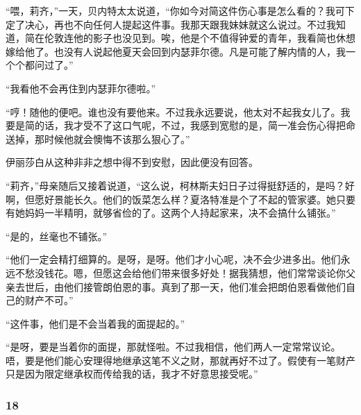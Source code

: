 \par “喂，莉齐，”一天，贝内特太太说道，“你如今对简这件伤心事是怎么看的？我可下定了决心，再也不向任何人提起这件事。我那天跟我妹妹就这么说过。不过我知道，简在伦敦连他的影子也没见到。唉，他是个不值得钟爱的青年，我看简也休想嫁给他了。也没有人说起他夏天会回到内瑟菲尔德。凡是可能了解内情的人，我一个个都问过了。”
\par “我看他不会再住到内瑟菲尔德啦。”
\par “哼！随他的便吧。谁也没有要他来。不过我永远要说，他太对不起我女儿了。我要是简的话，我才受不了这口气呢，不过，我感到宽慰的是，简一准会伤心得把命送掉，那时候他就会懊悔不该那么狠心了。”
\par 伊丽莎白从这种非非之想中得不到安慰，因此便没有回答。
\par “莉齐，”母亲随后又接着说道，“这么说，柯林斯夫妇日子过得挺舒适的，是吗？好啊，但愿好景能长久。他们的饭菜怎么样？夏洛特准是个了不起的管家婆。她只要有她妈妈一半精明，就够省俭的了。这两个人持起家来，决不会搞什么铺张。”
\par “是的，丝毫也不铺张。”
\par “他们一定会精打细算的。是呀，是呀。他们才小心呢，决不会少进多出。他们永远不愁没钱花。嗯，但愿这会给他们带来很多好处！据我猜想，他们常常谈论你父亲去世后，由他们接管朗伯恩的事。真到了那一天，他们准会把朗伯恩看做他们自己的财产不可。”
\par “这件事，他们是不会当着我的面提起的。”
\par “是呀，要是当着你的面提，那就怪啦。不过我相信，他们两人一定常常议论。唔，要是他们能心安理得地继承这笔不义之财，那就再好不过了。假使有一笔财产只是因为限定继承权而传给我的话，我才不好意思接受呢。”




\subsubsection*{18}


